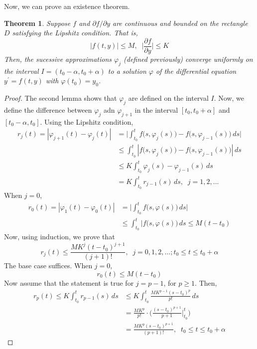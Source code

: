 \documentclass{article}
\newtheorem{theorem}{Theorem}[section]
\theoremstyle{remark}
\theoremstyle{definition}
\begin{document}
Now, we can prove an existence theorem. 

\begin{theorem}
Suppose $f$ and $\partial f/\partial y$ are continuous and bounded on the rectangle $D$ satisfying the Lipshitz condition. That is, 
\[|f(t, y)| \leq M, \;\; \Big| \frac{\partial f}{\partial y} \Big| \leq K\]
Then, the sucessive approximations $\varphi_j$ (defined previously) converge uniformly on the interval $I = (t_0 - \alpha, t_0 + \alpha)$ to a solution $\varphi$ of the differential equation $y^\prime = f(t, y)$ with $\varphi(t_0) = y_0$. 
\end{theorem}
\begin{proof}
The second lemma shows that $\varphi_j$ are defined on the interval $I$. Now, we define the difference between $\varphi_j$ adn $\varphi_{j+1}$ in the interval $[t_0, t_0 + \alpha]$ and $[t_0 - \alpha, t_0]$. Using the Lipshitz condition, 
\begin{align*}
    r_j (t) = |\varphi_{j+1} (t) - \varphi_j (t)| & = \bigg| \int_{t_0}^t f\big(s, \varphi_j (s)\big) - f\big(s, \varphi_{j-1} (s) \big) \,ds\bigg| \\
    & \leq \int_{t_0}^t |f\big(s, \varphi_j (s)\big) - f\big( s, \varphi_{j-1} (s)\big)|\,ds \\
    & \leq K \int_{t_0}^t \varphi_j (s) - \varphi_{j-1} (s) \,ds \\
    & = K \int_{t_0}^t r_{j-1} (s) \,ds, \;\; j = 1, 2, ...
\end{align*}
When $j=0$, 
\begin{align*}
    r_0 (t) = |\varphi_1 (t) - \varphi_0 (t)| & = \bigg| \int_{t_0}^t f \big(s, \varphi(s)\big) \,ds \bigg| \\
    & \leq \int_{t_0}^t |f\big(s, \varphi(s)\big)\,ds \leq M (t - t_0) 
\end{align*}
Now, using induction, we prove that 
\[r_j (t) \leq \frac{M K^j (t-t_0)^{j+1}}{(j+1)!}, \;\; j = 0, 1, 2, ...; t_0 \leq t \leq t_0 + \alpha\]
The base case suffices. When $j=0$, 
\[r_0 (t) \leq M (t-t_0)\]
Now assume that the statement is true for $j=p-1$, for $p \geq 1$. Then, 
\begin{align*}
    r_p (t) \leq K \int_{t_0}^t r_{p-1} (s) \, ds & \leq K \int_{t_0}^t \frac{M K^{p-1} (s - t_0)^p}{p!} \,ds \\
    & = \frac{M K^p}{p!} \cdot \bigg( \frac{(s-t_0)^{p+1}}{p+1} \bigg|_{t_0}^t \bigg) \\
    & = \frac{M K^p (s - t_0)^{p+1}}{(p+1)!}, \;\; t_0 \leq t \leq t_0 + \alpha
\end{align*}
\end{proof}
\end{document}
